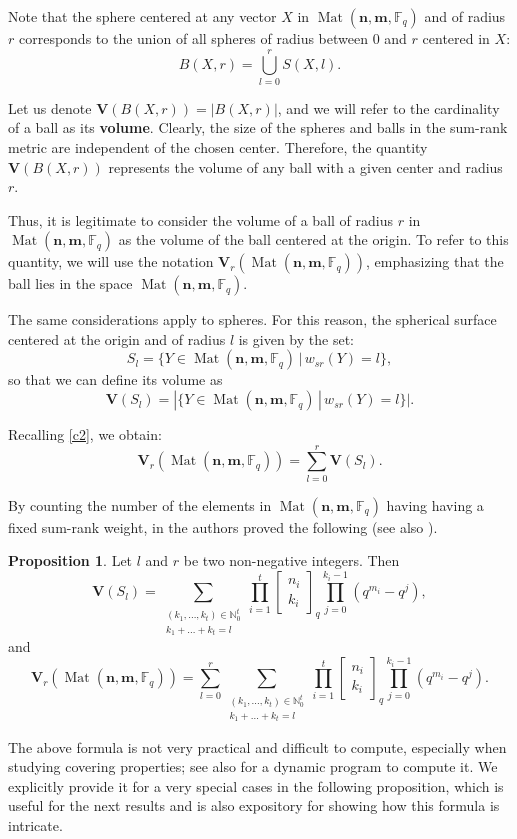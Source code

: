 \documentclass[11pt]{amsart}
\newcommand{\qqbin}[2]{\begin{bmatrix}
		{#1} \\ {#2 }
\end{bmatrix}_q}
\DeclareMathOperator{\Mat}{Mat}
\theoremstyle{definition}
\newtheorem{proposition}[theorem]{Proposition}
\newcommand{\F}{{\mathbb F}}
\newcommand{\bfn}{\mathbf {n}}
\newcommand{\bfm}{\mathbf {m}}
\newcommand{\spacmn}{\Mat(\bfn,\bfm,\F_q)}
\begin{document}
Note that the sphere centered at any vector $X$ in $\spacmn$ and of radius $r$ corresponds to the union of all spheres of radius between $0$ and $r$ centered in $X$:
\begin{equation} \label{c2}
	B(X,r)=\bigcup_{l=0}^r S(X,l).
\end{equation}

Let us denote $\mathbf{V}(B(X,r)) = |B(X,r)|$, and we will refer to the cardinality of a ball as its \textbf{volume}. Clearly, the size of the spheres and balls in the sum-rank metric are independent of the chosen center. Therefore, the quantity $\mathbf{V}(B(X,r))$ represents the volume of any ball with a given center and radius $r$. 

Thus, it is legitimate to consider the volume of a ball of radius $r$ in $\spacmn$ as the volume of the ball centered at the origin. To refer to this quantity, we will use the notation $\mathbf{V}_r(\spacmn)$, emphasizing that the ball lies in the space $\spacmn$.

The same considerations apply to spheres. For this reason, the spherical surface centered at the origin and of radius $l$ is given by the set:
$$
S_l = \{Y \in \spacmn \, | \, w_{sr}(Y) = l \},
$$
so that we can define its volume as
$$
\mathbf{V}(S_l) = |\{Y \in \spacmn \, | \, w_{sr}(Y) = l \}|.
$$

Recalling \eqref{c2}, we obtain:
\begin{equation} \label{c3} 
	\mathbf{V}_r(\spacmn) = \sum_{l=0}^{r} \mathbf{V}(S_l).
\end{equation}

By counting the number of the elements in $\spacmn$ having having a fixed sum-rank weight, in \cite[Section III]{byrne2021fundamental} the authors proved the following (see also \cite[Section 4]{sauerbier2025bounds}).

\begin{proposition} \label{c6}
Let $l$ and $r$ be two non-negative integers. Then
\[
\mathbf{V}(S_l) = \sum_{\substack{(k_1,\ldots,k_t) \in \mathbb{N}_0^t \\ k_1+\ldots+k_t=l}} \prod_{i=1}^{t} \qqbin{n_i}{k_i} \prod_{j=0}^{k_i-1}(q^{m_i}-q^j),
\]
and
\[
\mathbf{V}_r(\spacmn) = \sum_{l=0}^{r} \sum_{\substack{(k_1,\ldots,k_t) \in \mathbb{N}_0^t \\ k_1+\ldots+k_t=l}} \prod_{i=1}^{t} \qqbin{n_i}{k_i} \prod_{j=0}^{k_i-1}(q^{m_i}-q^j).
\]
\end{proposition}

The above formula is not very practical and difficult to compute, especially when studying covering properties; see also \cite{puchinger2022generic} for a dynamic program to compute it. 
We explicitly provide it for a very special cases in the following proposition, which is useful for the next results and is also expository for showing how this formula is intricate.
\end{document}
